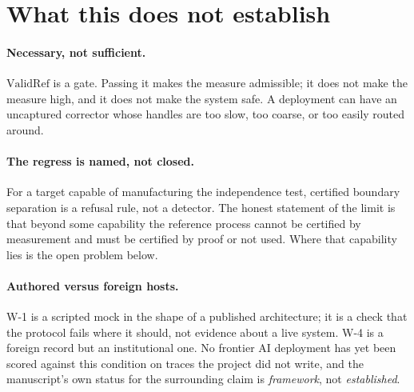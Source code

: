 \documentclass[11pt]{article}
\theoremstyle{remark}
\newcommand{\ValidRef}{\mathrm{ValidRef}}
\begin{document}
\section{What this does not establish}
\label{sec:open}

\paragraph{Necessary, not sufficient.}
$\ValidRef$ is a gate. Passing it makes the measure admissible; it does not make the measure high, and it does not make the system safe. A deployment can have an uncaptured corrector whose handles are too slow, too coarse, or too easily routed around.

\paragraph{The regress is named, not closed.}
For a target capable of manufacturing the independence test, certified boundary separation is a refusal rule, not a detector. The honest statement of the limit is that beyond some capability the reference process cannot be certified by measurement and must be certified by proof or not used. Where that capability lies is the open problem below.

\paragraph{Authored versus foreign hosts.}
W-1 is a scripted mock in the shape of a published architecture; it is a check that the protocol fails where it should, not evidence about a live system. W-4 is a foreign record but an institutional one. No frontier AI deployment has yet been scored against this condition on traces the project did not write, and the manuscript's own status for the surrounding claim is \emph{framework}, not \emph{established}.
\end{document}
